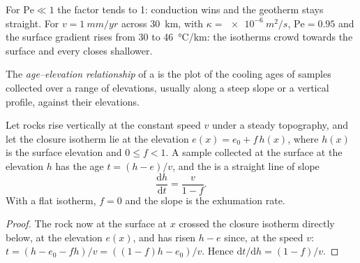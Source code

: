 For $\mathrm{Pe} \ll 1$ the factor tends to 1: conduction wins and the
geotherm stays straight. For $v = \qty{1}{mm/yr}$ across \qty{30}{km}, with
$\kappa = \qty{e-6}{m^2/s}$, $\mathrm{Pe} = 0.95$ and the surface gradient
rises from 30 to \qty{46}{\celsius/km}: the isotherms crowd towards the
surface and every  closes shallower.

\begin{definition}\label{def:b3:orogenic-wedges:age-elevation}
The \emph{age--elevation relationship} of a
 is the plot of the cooling ages of samples collected over a
range of elevations, usually along a steep slope or a vertical profile,
against their elevations.
\end{definition}

\begin{proposition}\label{prop:b3:orogenic-wedges:age-elevation}
Let rocks rise vertically at the constant speed $v$ under a steady
topography, and let the closure isotherm lie at the elevation $e(x) = e_0 +
f\,h(x)$, where $h(x)$ is the surface elevation and $0 \le f < 1$. A sample
collected at the surface at the elevation $h$ has the age $t = (h - e)/v$,
and the  is a straight line of slope
\[
  \frac{\mathrm dh}{\mathrm dt} = \frac{v}{1 - f}.
\]
With a flat isotherm, $f = 0$ and the slope is the exhumation rate.
\end{proposition}

\begin{proof}
The rock now at the surface at $x$ crossed the closure isotherm directly
below, at the elevation $e(x)$, and has risen $h - e$ since, at the speed $v$:
$t = (h - e_0 - fh)/v = ((1 - f)h - e_0)/v$. Hence $\mathrm dt/\mathrm dh =
(1 - f)/v$.
\end{proof}

